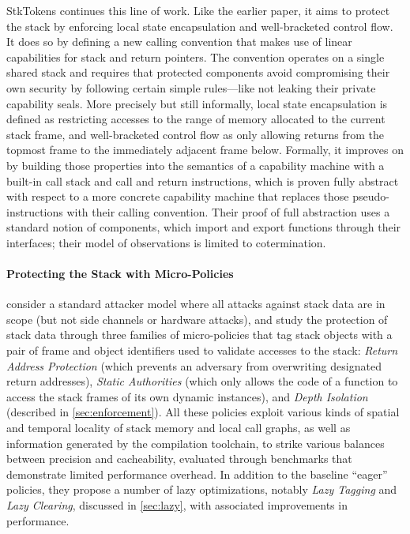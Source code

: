 \documentclass[acmsmall,review,anonymous]{acmart}\settopmatter{printfolios=true,printccs=false,printacmref=false}
\begin{document}
StkTokens \citep{Skorstengaard+19} continues this line of work. Like
the earlier paper, it aims to protect the stack by enforcing local state
encapsulation and well-bracketed control flow. It does so by defining a new
calling convention that makes use of linear capabilities for stack and return
pointers. The convention operates on a single shared stack and requires that
protected components avoid compromising their own security by following certain
simple rules---like not leaking their private capability seals. More
precisely but still informally, local state encapsulation is defined as
restricting accesses to the range of memory allocated to the current stack
frame, and well-bracketed control flow as only allowing returns from the topmost
frame to the immediately adjacent frame below. Formally, it improves on
\citet{Skorstengaard+19b} by building those properties into the semantics of a
capability machine with a built-in call stack and call and return instructions,
which is proven fully abstract with respect to a more concrete capability
machine that replaces those pseudo-instructions with their calling convention.
Their proof of full abstraction uses a standard notion of components, which
import and export functions through their interfaces; their model of
observations is limited to cotermination.

\paragraph{Protecting the Stack with Micro-Policies}
%
\citet{DBLP:conf/sp/RoesslerD18} consider a standard attacker model where all
attacks against stack data are in scope (but not side channels or hardware
attacks), and study the protection of stack data through three families of
micro-policies that tag stack objects with a pair of frame and object identifiers
used to validate accesses to the stack: {\em Return Address Protection} (which
prevents an adversary from overwriting designated return addresses), {\em Static
Authorities} (which only allows the code of a function to access the stack frames
of its own dynamic instances), and {\em Depth Isolation} (described in
\cref{sec:enforcement}). All these policies exploit various kinds of spatial and
temporal locality of stack memory and local call graphs, as well as information
generated by the compilation toolchain, to strike various balances between
precision and cacheability, evaluated through benchmarks that demonstrate
limited performance overhead. In addition to the baseline ``eager'' policies,
they propose a number of lazy optimizations, notably {\em Lazy Tagging} and
{\em Lazy
Clearing}, discussed in \cref{sec:lazy}, with associated improvements in
performance.
\end{document}
